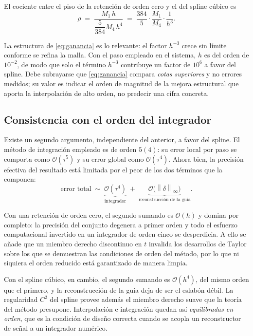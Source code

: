 \documentclass[12pt,a4paper]{article}
\newcommand{\dnorm}[1]{\left\lVert #1 \right\rVert}
\newcommand{\infnorm}[1]{\dnorm{#1}_{\infty}}
\begin{document}
El cociente entre el piso de la retención de orden cero y el del spline cúbico es
\begin{equation}
\label{eq:ganancia}
  \rho \;=\;
  \frac{M_1\,h}{\dfrac{5}{384}M_4\,h^{4}}
  \;=\;
  \frac{384}{5}\cdot\frac{M_1}{M_4}\cdot\frac{1}{h^{3}} .
\end{equation}

La estructura de \eqref{eq:ganancia} es lo relevante: el factor $h^{-3}$ crece sin
límite conforme se refina la malla. Con el paso empleado en el sistema, $h$ es del
orden de $10^{-2}$, de modo que solo el término $h^{-3}$ contribuye un factor de
$10^{6}$ a favor del spline. Debe subrayarse que \eqref{eq:ganancia} compara
\emph{cotas superiores} y no errores medidos; su valor es indicar el orden de
magnitud de la mejora estructural que aporta la interpolación de alto orden, no
predecir una cifra concreta.

\subsection{Consistencia con el orden del integrador}

Existe un segundo argumento, independiente del anterior, a favor del spline. El
método de integración empleado es de orden $5(4)$: su error local por paso se
comporta como $\mathcal{O}(\tau^{5})$ y su error global como
$\mathcal{O}(\tau^{4})$. Ahora bien, la precisión efectiva del resultado está
limitada por el peor de los dos términos que la componen:
\[
  \text{error total}
  \;\sim\;
  \underbrace{\mathcal{O}(\tau^{4})}_{\text{integrador}}
  \;+\;
  \underbrace{\mathcal{O}\bigl(\infnorm{\delta}\bigr)}_{\text{reconstrucción de la guía}} .
\]

Con una retención de orden cero, el segundo sumando es $\mathcal{O}(h)$ y domina
por completo: la precisión del conjunto degenera a primer orden y todo el esfuerzo
computacional invertido en un integrador de orden cinco se desperdicia. A ello se
añade que un miembro derecho discontinuo en $t$ invalida los desarrollos de Taylor
sobre los que se demuestran las condiciones de orden del método, por lo que ni
siquiera el orden reducido está garantizado de manera limpia.

Con el spline cúbico, en cambio, el segundo sumando es $\mathcal{O}(h^{4})$, del
mismo orden que el primero, y la reconstrucción de la guía deja de ser el eslabón
débil. La regularidad $C^{2}$ del spline provee además el miembro derecho suave
que la teoría del método presupone. Interpolación e integración quedan así
\emph{equilibradas en orden}, que es la condición de diseño correcta cuando se
acopla un reconstructor de señal a un integrador numérico.
\end{document}
